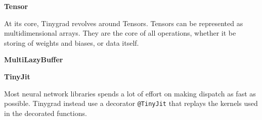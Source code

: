 \textbf{Tensor}

At its core, Tinygrad revolves around Tensors. Tensors can be represented as multidimensional arrays. They are the core of all operations, whether it be storing of weights and biases, or data itself.

\textbf{MultiLazyBuffer}

\textbf{TinyJit}

Most neural network libraries spends a lot of effort on making dispatch as fast as possible. Tinygrad instead use a decorator \texttt{@TinyJit} that replays the kernels used in the decorated functions.